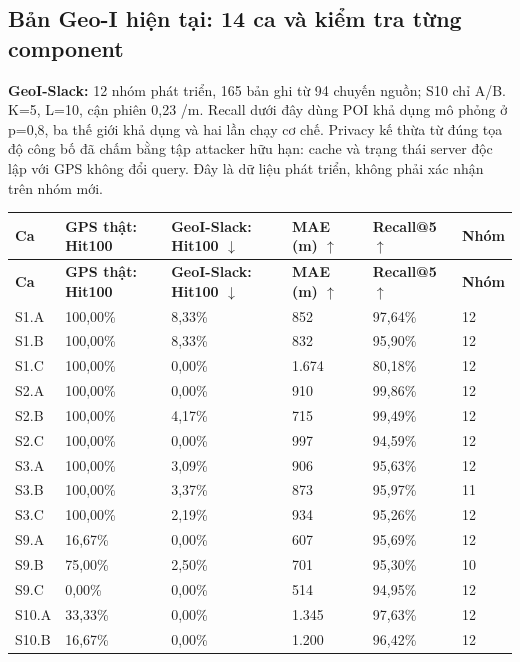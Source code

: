 \clearpage
\subsection{Bản Geo-I hiện tại: 14 ca và kiểm tra từng component}
\textbf{GeoI-Slack:} 12 nhóm phát triển, 165 bản ghi từ 94 chuyến nguồn; S10 chỉ A/B. K=5, L=10, cận phiên 0,23 /m. Recall dưới đây dùng POI khả dụng mô phỏng ở p=0,8, ba thế giới khả dụng và hai lần chạy cơ chế. Privacy kế thừa từ đúng tọa độ công bố đã chấm bằng tập attacker hữu hạn: cache và trạng thái server độc lập với GPS không đổi query. Đây là dữ liệu phát triển, không phải xác nhận trên nhóm mới.

\begingroup\small
\begin{longtable}{@{}P{1.589cm}P{2.980cm}P{3.477cm}P{2.980cm}P{3.179cm}P{1.589cm}@{}}
\toprule
\textbf{Ca} & \textbf{GPS thật: Hit100} & \textbf{GeoI-Slack: Hit100 $\downarrow$} & \textbf{MAE (m) $\uparrow$} & \textbf{Recall@5 $\uparrow$} & \textbf{Nhóm}\\\midrule
\endfirsthead
\toprule
\textbf{Ca} & \textbf{GPS thật: Hit100} & \textbf{GeoI-Slack: Hit100 $\downarrow$} & \textbf{MAE (m) $\uparrow$} & \textbf{Recall@5 $\uparrow$} & \textbf{Nhóm}\\\midrule
\endhead
\bottomrule\endfoot
S1.A & 100,00\% & 8,33\% & 852 & 97,64\% & 12\\
\addlinespace[3pt]
S1.B & 100,00\% & 8,33\% & 832 & 95,90\% & 12\\
\addlinespace[3pt]
S1.C & 100,00\% & 0,00\% & 1.674 & 80,18\% & 12\\
\addlinespace[3pt]
S2.A & 100,00\% & 0,00\% & 910 & 99,86\% & 12\\
\addlinespace[3pt]
S2.B & 100,00\% & 4,17\% & 715 & 99,49\% & 12\\
\addlinespace[3pt]
S2.C & 100,00\% & 0,00\% & 997 & 94,59\% & 12\\
\addlinespace[3pt]
S3.A & 100,00\% & 3,09\% & 906 & 95,63\% & 12\\
\addlinespace[3pt]
S3.B & 100,00\% & 3,37\% & 873 & 95,97\% & 11\\
\addlinespace[3pt]
S3.C & 100,00\% & 2,19\% & 934 & 95,26\% & 12\\
\addlinespace[3pt]
S9.A & 16,67\% & 0,00\% & 607 & 95,69\% & 12\\
\addlinespace[3pt]
S9.B & 75,00\% & 2,50\% & 701 & 95,30\% & 10\\
\addlinespace[3pt]
S9.C & 0,00\% & 0,00\% & 514 & 94,95\% & 12\\
\addlinespace[3pt]
S10.A & 33,33\% & 0,00\% & 1.345 & 97,63\% & 12\\
\addlinespace[3pt]
S10.B & 16,67\% & 0,00\% & 1.200 & 96,42\% & 12\\
\end{longtable}
